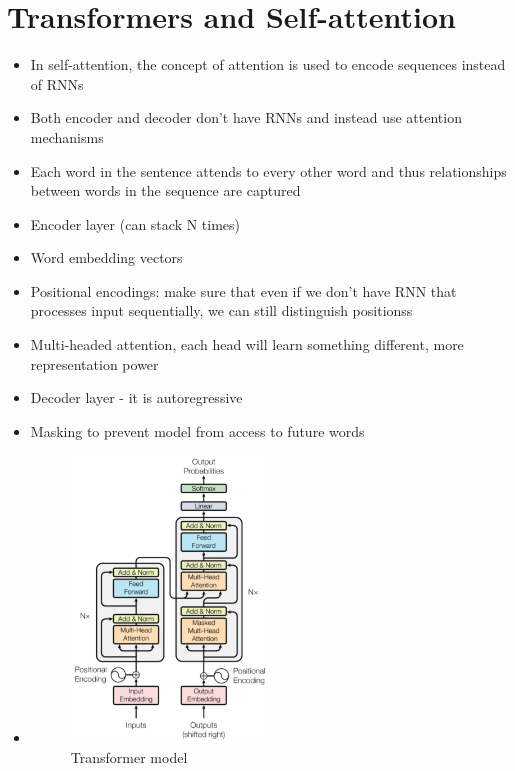\documentclass[../main.tex]{subfiles}
\begin{document}
\section{Transformers and Self-attention}
\begin{itemize}
  \item In self-attention, the concept of attention is used to encode sequences instead of RNNs
  \item Both encoder and decoder don't have RNNs and instead use attention mechanisms
  \item Each word in the sentence attends to every other word and thus relationships between words in the sequence are captured
  \item Encoder layer (can stack N times)
  \item Word embedding vectors
  \item Positional encodings: make sure that even if we don't have RNN that processes input sequentially, we can still distinguish positionss
  \item Multi-headed attention, each head will learn something different, more representation power
  \item Decoder layer - it is autoregressive
  \item Masking to prevent model from access to future words
  \item \begin{figure}[h]
      \caption{Transformer model}
      \centering
      \includegraphics[width=0.5\textwidth]{../imgs/transformer.png}
      \end{figure}
\end{itemize}
\end{document}

